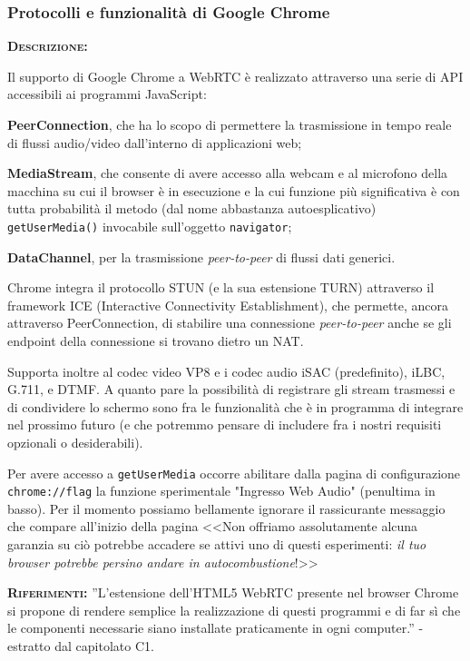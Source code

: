\subsubsection{Protocolli e funzionalità di Google Chrome}
\begin{description}
	\item{\scshape\bfseries Descrizione:}
  
Il supporto di Google Chrome a WebRTC è realizzato attraverso una serie di API accessibili ai programmi JavaScript:
\begin{description}
\item{\bfseries PeerConnection}, che ha lo scopo di permettere la trasmissione in tempo reale di flussi audio/video dall'interno di applicazioni web;
\item{\bfseries MediaStream}, che consente di avere accesso alla webcam e al microfono della macchina su cui il browser è in esecuzione e la cui funzione più significativa è con tutta probabilità il metodo (dal nome abbastanza autoesplicativo) \texttt{getUserMedia()} invocabile sull'oggetto \texttt{navigator};
\item{\bfseries DataChannel}, per la trasmissione \textit{peer-to-peer} di flussi dati generici.
\end{description}

Chrome integra il protocollo STUN (e la sua estensione TURN) attraverso il framework ICE (Interactive Connectivity Establishment), che permette, ancora attraverso PeerConnection, di stabilire una connessione \textit{peer-to-peer} anche se gli endpoint della connessione si trovano dietro un NAT\@. 

Supporta inoltre al codec video VP8 e i codec audio iSAC (predefinito), iLBC, G.711, e DTMF\@. A quanto pare la possibilità di registrare gli stream trasmessi e di condividere lo schermo sono fra le funzionalità che è in programma di integrare nel prossimo futuro (e che potremmo pensare di includere fra i nostri requisiti opzionali o desiderabili).

Per avere accesso a \texttt{getUserMedia} occorre abilitare dalla pagina di configurazione \texttt{chrome://flag} la funzione sperimentale "Ingresso Web Audio" (penultima in basso). Per il momento possiamo bellamente ignorare il rassicurante messaggio che compare all'inizio della pagina <<Non offriamo assolutamente alcuna garanzia su ciò potrebbe accadere se attivi uno di questi esperimenti: \textit{il tuo browser potrebbe persino andare in autocombustione}!>>
	\item{\scshape\bfseries Riferimenti:}
  ''L'estensione dell'HTML5 WebRTC presente nel browser Chrome si propone di rendere semplice la realizzazione di questi programmi e di far sì che le componenti necessarie siano installate praticamente in ogni computer.'' - estratto dal capitolato C1.


\end{description}

